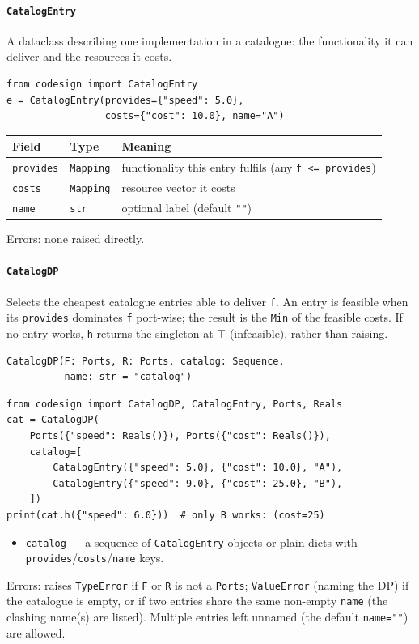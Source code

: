 \documentclass[11pt,a4paper]{article}
\newcommand{\topp}{\top}
\begin{document}
\paragraph{\texttt{CatalogEntry}}
\label{ref:dp:catalogentry}
A dataclass describing one implementation in a catalogue: the
functionality it can deliver and the resources it costs.
\begin{lstlisting}
from codesign import CatalogEntry
e = CatalogEntry(provides={"speed": 5.0},
                 costs={"cost": 10.0}, name="A")
\end{lstlisting}
\begin{center}
\begin{tabular}{@{}lll@{}}
\toprule
Field & Type & Meaning \\
\midrule
\texttt{provides} & \texttt{Mapping} & functionality this entry fulfils
  (any \texttt{f <= provides}) \\
\texttt{costs}    & \texttt{Mapping} & resource vector it costs \\
\texttt{name}     & \texttt{str}     & optional label (default \texttt{""}) \\
\bottomrule
\end{tabular}
\end{center}
Errors: none raised directly.

\paragraph{\texttt{CatalogDP}}
\label{ref:dp:catalogdp}
Selects the cheapest catalogue entries able to deliver \texttt{f}. An
entry is feasible when its \texttt{provides} dominates \texttt{f}
port-wise; the result is the \texttt{Min} of the feasible costs. If no
entry works, \texttt{h} returns the singleton at $\topp$ (infeasible),
rather than raising.
\begin{lstlisting}
CatalogDP(F: Ports, R: Ports, catalog: Sequence,
          name: str = "catalog")
\end{lstlisting}
\begin{lstlisting}
from codesign import CatalogDP, CatalogEntry, Ports, Reals
cat = CatalogDP(
    Ports({"speed": Reals()}), Ports({"cost": Reals()}),
    catalog=[
        CatalogEntry({"speed": 5.0}, {"cost": 10.0}, "A"),
        CatalogEntry({"speed": 9.0}, {"cost": 25.0}, "B"),
    ])
print(cat.h({"speed": 6.0}))  # only B works: (cost=25)
\end{lstlisting}
\begin{itemize}[nosep]
  \item \texttt{catalog} --- a sequence of \texttt{CatalogEntry} objects
        or plain dicts with \texttt{provides}/\texttt{costs}/\texttt{name}
        keys.
\end{itemize}
Errors: raises \texttt{TypeError} if \texttt{F} or \texttt{R} is not a
\texttt{Ports}; \texttt{ValueError} (naming the DP) if the catalogue is
empty, or if two entries share the same non-empty \texttt{name} (the
clashing name(s) are listed). Multiple entries left unnamed (the default
\texttt{name=""}) are allowed.
\end{document}
